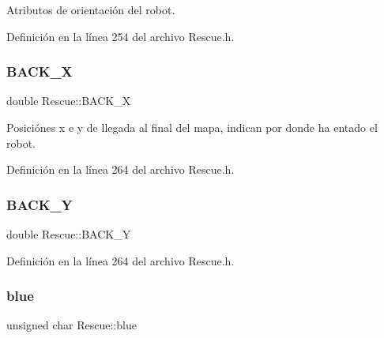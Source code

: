 Atributos de orientación del robot. 



Definición en la línea 254 del archivo Rescue.\+h.

\mbox{\label{classRescue_acc6616f1ab243e26c8903faca1cc7feb_acc6616f1ab243e26c8903faca1cc7feb}} 
\subsubsection{\texorpdfstring{B\+A\+C\+K\+\_\+X}{BACK\_X}}
{\footnotesize\ttfamily double Rescue\+::\+B\+A\+C\+K\+\_\+X\hspace{0.3cm}{\ttfamily [private]}}



Posiciónes x e y de llegada al final del mapa, indican por donde ha entado el robot. 



Definición en la línea 264 del archivo Rescue.\+h.

\mbox{\label{classRescue_aab2477ae06d7c87401e2306f36261120_aab2477ae06d7c87401e2306f36261120}} 
\subsubsection{\texorpdfstring{B\+A\+C\+K\+\_\+Y}{BACK\_Y}}
{\footnotesize\ttfamily double Rescue\+::\+B\+A\+C\+K\+\_\+Y\hspace{0.3cm}{\ttfamily [private]}}



Definición en la línea 264 del archivo Rescue.\+h.

\mbox{\label{classRescue_adeb74390f710b4a180605f4a68e1bc77_adeb74390f710b4a180605f4a68e1bc77}} 
\subsubsection{\texorpdfstring{blue}{blue}}
{\footnotesize\ttfamily unsigned char Rescue\+::blue\hspace{0.3cm}{\ttfamily [private]}}



